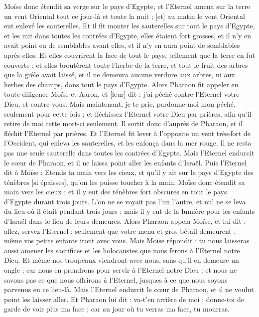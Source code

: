 \begin{multicols}{2}
Moïse donc étendit sa verge sur le pays d'Egypte, et l'Eternel amena sur la terre un vent Oriental tout ce jour-là et toute la nuit ; [et] au matin le vent Oriental eut enlevé les sauterelles.
Et il fit monter les sauterelles sur tout le pays d'Egypte, et les mit dans toutes les contrées d'Egypte, elles étaient fort grosses, et il n'y en avait point eu de semblables avant elles, et il n'y en aura point de semblables après elles.
Et elles couvrirent la face de tout le pays, tellement que la terre en fut couverte ; et elles broutèrent toute l'herbe de la terre, et tout le fruit des arbres que la grêle avait laissé, et il ne demeura aucune verdure aux arbres, ni aux herbes des champs, dans tout le pays d'Egypte.
Alors Pharaon fit appeler en toute diligence Moïse et Aaron, et [leur] dit : j'ai péché contre l'Eternel votre Dieu, et contre vous.
Mais maintenant, je te prie, pardonne-moi mon péché, seulement pour cette fois ; et fléchissez l'Eternel votre Dieu par prières, afin qu'il retire de moi cette mort-ci seulement.
Il sortit donc d'auprès de Pharaon, et il fléchit l'Eternel par prières.
Et l'Eternel fit lever à l'opposite un vent très-fort de l'Occident, qui enleva les sauterelles, et les enfonça dans la mer rouge. Il ne resta pas une seule sauterelle dans toutes les contrées d'Egypte.
Mais l'Eternel endurcit le cœur de Pharaon, et il ne laissa point aller les enfants d'Israël.
Puis l'Eternel dit à Moïse : Etends ta main vers les cieux, et qu'il y ait sur le pays d'Egypte des ténèbres [si épaisses], qu'on les puisse toucher à la main.
Moïse donc étendit sa main vers les cieux ; et il y eut des ténèbres fort obscures en tout le pays d'Egypte durant trois jours.
L'on ne se voyait pas l'un l'autre, et nul ne se leva du lieu où il était pendant trois jours ; mais il y eut de la lumière pour les enfants d'Israël dans le lieu de leurs demeures.
Alors Pharaon appela Moïse, et lui dit : allez, servez l'Eternel ; seulement que votre menu et gros bétail demeurent ; même vos petits enfants iront avec vous.
Mais Moïse répondit : tu nous laisseras aussi amener les sacrifices et les holocaustes que nous ferons à l'Eternel notre Dieu.
Et même nos troupeaux viendront avec nous, sans qu'il en demeure un ongle ; car nous en prendrons pour servir à l'Eternel notre Dieu ; et nous ne savons pas ce que nous offrirons à l'Eternel, jusques à ce que nous soyons parvenus en ce lieu-là.
Mais l'Eternel endurcit le cœur de Pharaon, et il ne voulut point les laisser aller.
Et Pharaon lui dit : va-t'en arrière de moi ; donne-toi de garde de voir plus ma face ; car au jour où tu verras ma face, tu mourras.

\end{multicols}
